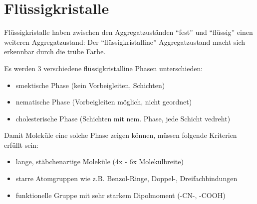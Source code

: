\section{Flüssigkristalle}
Flüssigkristalle haben zwischen den Aggregatzuständen ``fest'' und ``flüssig'' einen weiteren Aggregatzustand: Der ``flüssigkristalline'' Aggregatzustand macht sich erkennbar durch die trübe Farbe.        

Es werden 3 verschiedene flüssigkristalline Phasen unterschieden:
\begin{itemize}
    \item smektische Phase (kein Vorbeigleiten, Schichten)
    \item nematische Phase (Vorbeigleiten möglich, nicht geordnet)
    \item cholesterische Phase (Schichten mit nem. Phase, jede Schicht vedreht)
\end{itemize}
Damit Moleküle eine solche Phase zeigen können, müssen folgende Kriterien erfüllt sein:
\begin{itemize}
    \item lange, stäbchenartige Moleküle (4x - 6x Molekülbreite)
    \item starre Atomgruppen wie z.B. Benzol-Ringe, Doppel-, Dreifachbindungen
    \item funktionelle Gruppe mit sehr starkem Dipolmoment (-CN-, -COOH)
\end{itemize}

